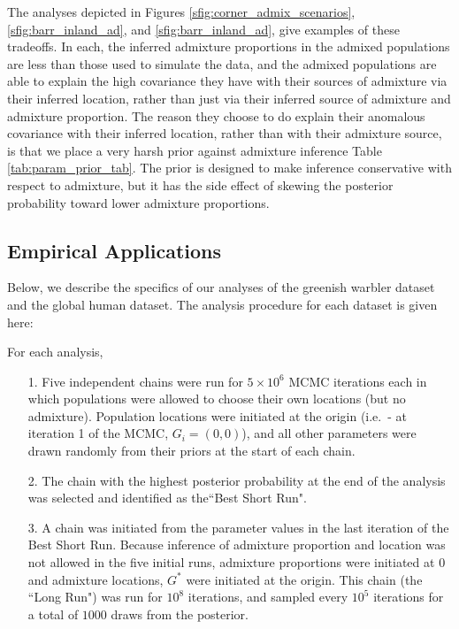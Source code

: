 \documentclass[12pt]{article}
\newcommand{\admixsource}[1]{{$G^{*}$}}
\begin{document}
The analyses depicted in Figures \ref{sfig:corner_admix_scenarios}, 
\ref{sfig:barr_inland_ad}, and
\ref{sfig:barr_inland_ad}, 
give examples of these tradeoffs.
In each, the inferred admixture proportions in the admixed populations are less than those used to simulate the data,
and the admixed populations are able to explain the high covariance they have with their sources of admixture via their inferred location,
rather than just via their inferred source of admixture and admixture proportion.  
The reason they choose to do explain their anomalous covariance with their inferred location,
rather than with their admixture source,
is that we place a very harsh prior against admixture inference Table \ref{tab:param_prior_tab}.
The prior is designed to make inference conservative with respect to admixture,
but it has the side effect of skewing the posterior probability toward lower admixture proportions.

\subsection*{Empirical Applications}
Below, we describe the specifics of our analyses of the greenish warbler dataset and the global human dataset.  The analysis procedure for each dataset is given here:

For each analysis,
\begin{itemize}
\item[1.] Five independent chains were run for $5\times 10^6$ MCMC iterations each in which populations were allowed to choose their own locations (but no admixture).  Population locations were initiated at the origin (i.e.\ - at iteration 1 of the MCMC, $G_i = (0,0)$), and all other parameters were drawn randomly from their priors at the start of each chain.  
\item[2.]The chain with the highest posterior probability at the end of the analysis was selected and identified as the``Best Short Run".
\item[3.] A chain was initiated from the parameter values in the last iteration of the Best Short Run.  Because inference of admixture proportion and location was not allowed in the five initial runs, admixture proportions were initiated at 0 and admixture locations, \admixsource{G} were initiated at the origin.  This  chain (the ``Long Run") was run for $10^8$ iterations, and sampled every $10^5$ iterations for a total of $1000$ draws from the posterior.
\end{itemize}
\end{document}
